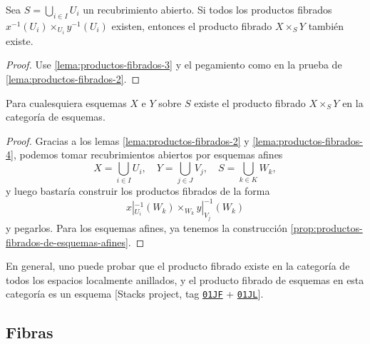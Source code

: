 \documentclass{article}
\numberwithin{equation}{section}
\theoremstyle{definition}
\begin{document}
\begin{lema}
  \label{lema:productos-fibrados-4}
  Sea $S = \bigcup_{i\in I} U_i$ un recubrimiento abierto. Si todos
  los productos fibrados $x^{-1} (U_i) \times_{U_i} y^{-1} (U_i)$ existen,
  entonces el producto fibrado $X\times_S Y$ también existe.

  \begin{proof}
    Use \ref{lema:productos-fibrados-3} y el pegamiento como en la prueba
    de \ref{lema:productos-fibrados-2}.
  \end{proof}
\end{lema}

\begin{teorema}
  Para cualesquiera esquemas $X$ e $Y$ sobre $S$ existe el producto fibrado
  $X \times_S Y$ en la categoría de esquemas.

  \begin{proof}
    Gracias a los lemas \ref{lema:productos-fibrados-2} y
    \ref{lema:productos-fibrados-4}, podemos tomar recubrimientos abiertos por
    esquemas afines
    \[ X = \bigcup_{i\in I} U_i, \quad
       Y = \bigcup_{j\in J} V_j, \quad
       S = \bigcup_{k\in K} W_k, \]
    y luego bastaría construir los productos fibrados de la forma
    $$x|_{U_i}^{-1} (W_k) \times_{W_k} y|_{V_j}^{-1} (W_k)$$
    y pegarlos. Para los esquemas afines, ya tenemos la construcción
    \ref{prop:productos-fibrados-de-esquemas-afines}.
  \end{proof}
\end{teorema}

\begin{comentario}
  En general, uno puede probar que el producto fibrado existe en la categoría
  de todos los espacios localmente anillados, y el producto fibrado de esquemas
  en esta categoría es un esquema [Stacks project, tag
  \texttt{\href{https://stacks.math.columbia.edu/tag/01JF}{01JF}} +
  \texttt{\href{https://stacks.math.columbia.edu/tag/01JL}{01JL}}].
\end{comentario}

\subsection{Fibras}
\end{document}
